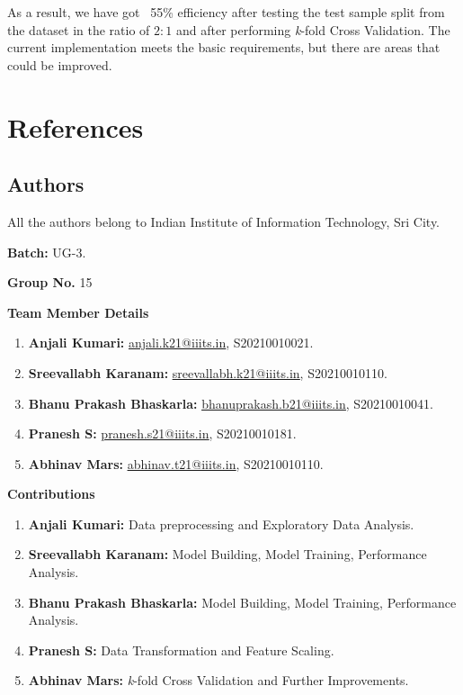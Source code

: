 \documentclass{article}
\begin{document}
\begin{justify}
As a result, we have got ~55\% efficiency after testing the test sample split from the dataset in the ratio of $2:1$ and after performing \textit{k}-fold Cross Validation. The current implementation meets the basic requirements, but there are areas that could be improved. 

\section{References}\label{sec:references}

\subsection{Authors}\label{authors}
\setlength{\leftskip}{.2cm}
All the authors belong to Indian Institute of Information Technology, Sri City. 

\setlength{\leftskip}{-.3cm}
\textbf{Batch:} UG-3.

\setlength{\leftskip}{-.3cm}
\textbf{Group No.} 15

\vspace{.5cm}
\setlength{\leftskip}{-.5cm}
\textbf{Team Member Details}

\begin{enumerate}
    \item \label{author:anjali} \textbf{Anjali Kumari:} \href{mailto:anjali.k21@iiits.in}{\underline{anjali.k21@iiits.in}}, S20210010021.
    \item \label{author:sreevallabh} \textbf{Sreevallabh Karanam:} \href{mailto:sreevallabh.k21@iiits.in}{\underline{sreevallabh.k21@iiits.in}}, S20210010110.
    \item \label{author:bhanu} \textbf{Bhanu Prakash Bhaskarla:} \href{mailto:bhanuprakash.b21@iiits.in}{\underline{bhanuprakash.b21@iiits.in}}, S20210010041.
    \item \label{author:pranesh} \textbf{Pranesh S:} \href{mailto:pranesh.s21@iiits.in}{\underline{pranesh.s21@iiits.in}}, S20210010181.
    \item \label{author:abhinav} \textbf{Abhinav Mars:} \href{mailto:abhinav.t21@iiits.in}{\underline{abhinav.t21@iiits.in}}, S20210010110.
\end{enumerate}

\setlength{\leftskip}{-.5cm}
\textbf{Contributions}

\begin{enumerate}
    \item \label{author:anjali} \textbf{Anjali Kumari:} Data preprocessing and Exploratory Data Analysis.
    \item \label{author:sreevallabh} \textbf{Sreevallabh Karanam:} Model Building, Model Training, Performance Analysis.
    \item \label{author:bhanu} \textbf{Bhanu Prakash Bhaskarla:} Model Building, Model Training, Performance Analysis.
    \item \label{author:pranesh} \textbf{Pranesh S:} Data Transformation and Feature Scaling.
    \item \label{author:abhinav} \textbf{Abhinav Mars:} \textit{k}-fold Cross Validation and Further Improvements.
\end{enumerate}


\end{justify}
\end{document}
